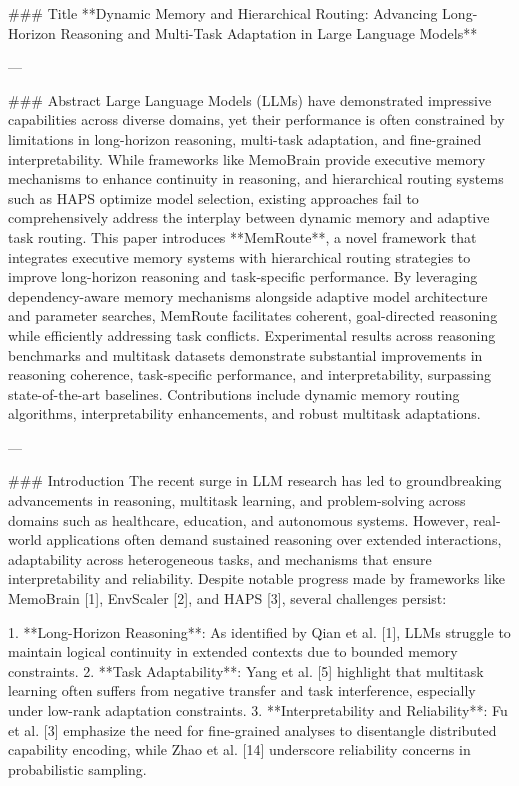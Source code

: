 ### Title  
**Dynamic Memory and Hierarchical Routing: Advancing Long-Horizon Reasoning and Multi-Task Adaptation in Large Language Models**

---

### Abstract  
Large Language Models (LLMs) have demonstrated impressive capabilities across diverse domains, yet their performance is often constrained by limitations in long-horizon reasoning, multi-task adaptation, and fine-grained interpretability. While frameworks like MemoBrain provide executive memory mechanisms to enhance continuity in reasoning, and hierarchical routing systems such as HAPS optimize model selection, existing approaches fail to comprehensively address the interplay between dynamic memory and adaptive task routing. This paper introduces **MemRoute**, a novel framework that integrates executive memory systems with hierarchical routing strategies to improve long-horizon reasoning and task-specific performance. By leveraging dependency-aware memory mechanisms alongside adaptive model architecture and parameter searches, MemRoute facilitates coherent, goal-directed reasoning while efficiently addressing task conflicts. Experimental results across reasoning benchmarks and multitask datasets demonstrate substantial improvements in reasoning coherence, task-specific performance, and interpretability, surpassing state-of-the-art baselines. Contributions include dynamic memory routing algorithms, interpretability enhancements, and robust multitask adaptations.

---

### Introduction  
The recent surge in LLM research has led to groundbreaking advancements in reasoning, multitask learning, and problem-solving across domains such as healthcare, education, and autonomous systems. However, real-world applications often demand sustained reasoning over extended interactions, adaptability across heterogeneous tasks, and mechanisms that ensure interpretability and reliability. Despite notable progress made by frameworks like MemoBrain [1], EnvScaler [2], and HAPS [3], several challenges persist:

1. **Long-Horizon Reasoning**: As identified by Qian et al. [1], LLMs struggle to maintain logical continuity in extended contexts due to bounded memory constraints.
2. **Task Adaptability**: Yang et al. [5] highlight that multitask learning often suffers from negative transfer and task interference, especially under low-rank adaptation constraints.
3. **Interpretability and Reliability**: Fu et al. [3] emphasize the need for fine-grained analyses to disentangle distributed capability encoding, while Zhao et al. [14] underscore reliability concerns in probabilistic sampling.

